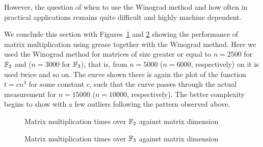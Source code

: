 However, the question of when to use the Winograd method and how often
in practical applications remains quite difficult and highly machine
dependent.

%
%

We conclude this section with Figures~\ref{matmulf2} and
\ref{matmulf3} showing the
performance of matrix multiplication using grease together with
the Winograd method. Here we used the Winograd method for matrices
of size greater or equal to $n=2500$ for $\mathbb{F}_2$ and ($n=3000$ for
$\mathbb{F}_3$), that is, from $n=5000$ ($n=6000$, respectively) on it
is used twice and so on. The curve shown there is 
again the plot of the function $t = cn^3$ for some constant $c$, such
that the curve passes through the actual measurement for $n=15000$
($n=10000$, respectively).
The better complexity begins to show with a few outliers following
the pattern observed above.

\begin{figure}[ht]
\begin{center}
\end{center}
\caption{Matrix multiplication times over $\mathbb{F}_2$ against matrix dimension}
\label{matmulf2}
\end{figure}

\begin{figure}[ht]
\begin{center}
\end{center}
\caption{Matrix multiplication times over $\mathbb{F}_3$ against matrix dimension}
\label{matmulf3}
\end{figure}

